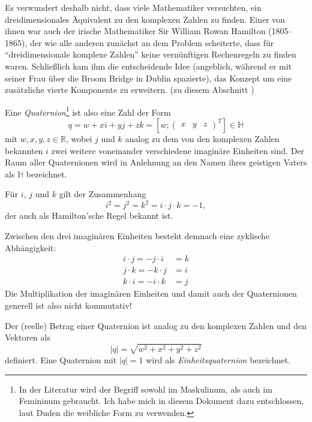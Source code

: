 Es verwundert deshalb nicht, dass viele Mathematiker versuchten, ein dreidimensionales Äquivalent zu den komplexen Zahlen zu finden. Einer von ihnen war auch der irische Mathematiker Sir William Rowan Hamilton (1805--1865), der wie alle anderen zunächst an dem Problem scheiterte, dass für \enquote{dreidimensionale komplexe Zahlen} keine vernünftigen Rechenregeln zu finden waren. Schließlich kam ihm die entscheidende Idee (angeblich, während er mit seiner Frau über die Broom Bridge in Dublin spazierte), das Konzept um eine zusätzliche vierte Komponente zu erweitern. (zu diesem Abschnitt )

Eine \emph{Quaternion}\footnote{In der Literatur wird der Begriff sowohl im Maskulinum, als auch im Femininum gebraucht. Ich habe mich in diesem Dokument dazu entschlossen, laut Duden die weibliche Form zu verwenden.} ist also eine Zahl der Form
\begin{equation}
 q = w + xi + yj + zk = \left[ w; \begin{pmatrix} x & y & z \end{pmatrix}^T \right] \in \mathbb H
\end{equation}
mit $w, x, y, z \in \mathbb R$, wobei $j$ und $k$ analog zu dem von den komplexen Zahlen bekannten $i$ zwei weitere voneinander verschiedene imaginäre Einheiten sind. Der Raum aller Quaternionen wird in Anlehnung an den Namen ihres geistigen Vaters als $\mathbb H$ bezeichnet.

Für $i$, $j$ und $k$ gilt der Zusammenhang
\begin{equation}
 i^2 = j^2 = k^2 = i \cdot j \cdot k = -1,
\end{equation} 
der auch als Hamilton'sche Regel bekannt ist.

Zwischen den drei imaginären Einheiten besteht demnach eine zyklische Abhängigkeit:
\begin{align}
 i \cdot j = -j \cdot i &= k \\
 j \cdot k = -k \cdot j &= i \\
 k \cdot i = -i \cdot k &= j
\end{align}
Die Multiplikation der imaginären Einheiten und damit auch der Quaternionen generell ist also nicht kommutativ!

Der (reelle) Betrag einer Quaternion ist analog zu den komplexen Zahlen und den Vektoren als 
\begin{equation}
 \left| q \right| = \sqrt{w^2 + x^2 + y^2 + z^2}
\end{equation}
definiert. Eine Quaternion mit $\left| q \right| = 1$ wird als \emph{Einheitsquaternion} bezeichnet.

